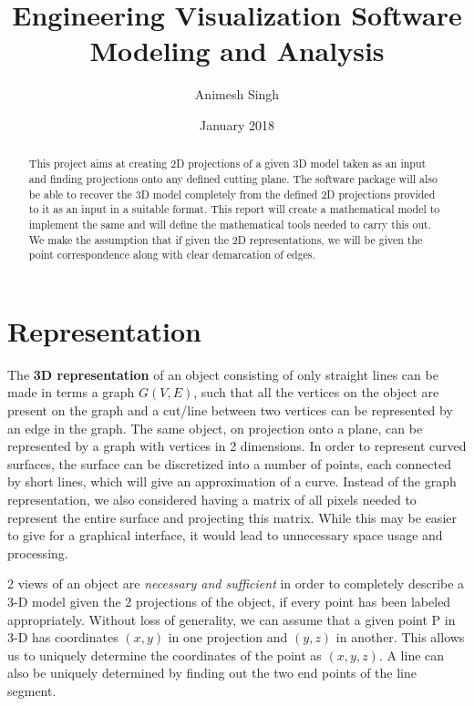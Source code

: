 \documentclass{article}
\title{\textbf{Engineering Visualization Software}
\linebreak Modeling and Analysis}
\author{Animesh Singh}
\date{January 2018}
\begin{document}
\maketitle 

\begin{abstract}
    This project aims at creating 2D projections of a given 3D model taken as an input and finding projections onto any defined cutting plane. The software package will also be able to recover the 3D model completely from the defined 2D projections provided to it as an input in a suitable format. This report will create a mathematical model to implement the same and will define the mathematical tools needed to carry this out. We make the assumption that if given the 2D representations, we will be given the point correspondence along with clear demarcation of edges. 
\end{abstract}
\section{Representation}
The \textbf{3D representation} of an object consisting of only straight lines can be made in terms a graph $G (V,E)$, such that all the vertices on the object are present on the graph and a cut/line between two vertices can be represented by an edge in the graph. The same object, on projection onto a plane, can be represented by a graph with vertices in 2 dimensions. In order to represent curved surfaces, the surface can be discretized into a number of points, each connected by short lines, which will give an approximation of a curve. Instead of the graph representation, we also considered having a matrix of all pixels needed to represent the entire surface and projecting this matrix. While this may be easier to give for a graphical interface, it would lead to unnecessary space usage and processing.\par
2 views of an object are \emph{necessary and sufficient} in order to completely describe a 3-D model given the 2 projections of the object, if every point has been labeled appropriately. Without loss of generality, we can assume that a given point P in 3-D has coordinates $(x,y)$ in one projection and $(y,z)$ in another. This allows us to uniquely determine the coordinates of the point as $(x,y,z)$. A line can also be uniquely determined by finding out the two end points of the line segment. 
\end{document}
